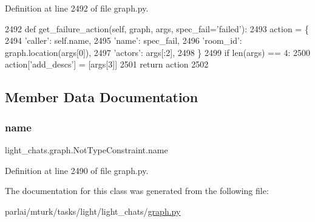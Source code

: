 Definition at line 2492 of file graph.\+py.


\begin{DoxyCode}
2492     \textcolor{keyword}{def }get\_failure\_action(self, graph, args, spec\_fail='failed'):
2493         action = \{
2494             \textcolor{stringliteral}{'caller'}: self.name,
2495             \textcolor{stringliteral}{'name'}: spec\_fail,
2496             \textcolor{stringliteral}{'room\_id'}: graph.location(args[0]),
2497             \textcolor{stringliteral}{'actors'}: args[:2],
2498         \}
2499         \textcolor{keywordflow}{if} len(args) == 4:
2500             action[\textcolor{stringliteral}{'add\_descs'}] = [args[3]]
2501         \textcolor{keywordflow}{return} action
2502 
\end{DoxyCode}


\subsection{Member Data Documentation}
\mbox{\label{classlight__chats_1_1graph_1_1NotTypeConstraint_ad6119b9dbdfc0d1049e91e3f46832601}} 
\subsubsection{\texorpdfstring{name}{name}}
{\footnotesize\ttfamily light\+\_\+chats.\+graph.\+Not\+Type\+Constraint.\+name\hspace{0.3cm}{\ttfamily [static]}}



Definition at line 2490 of file graph.\+py.



The documentation for this class was generated from the following file\+:\begin{DoxyCompactItemize}
\item 
parlai/mturk/tasks/light/light\+\_\+chats/\hyperlink{parlai_2mturk_2tasks_2light_2light__chats_2graph_8py}{graph.\+py}\end{DoxyCompactItemize}

